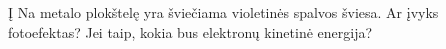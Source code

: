 \question Į Na metalo plokštelę yra šviečiama violetinės spalvos šviesa. Ar įvyks fotoefektas? Jei taip, kokia bus elektronų kinetinė energija?